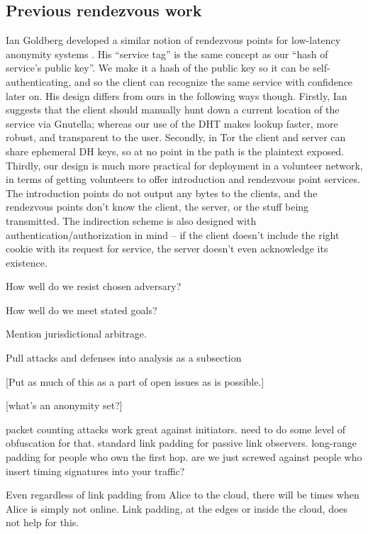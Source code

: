 \documentclass[times,10pt,twocolumn]{article}
\begin{document}
\subsection{Previous rendezvous work}

Ian Goldberg developed a similar notion of rendezvous points for
low-latency anonymity systems \cite{ian-thesis}. His ``service tag''
is the same concept as our ``hash of service's public key''. We make it
a hash of the public key so it can be self-authenticating, and so the
client can recognize the same service with confidence later on. His
design differs from ours in the following ways though. Firstly, Ian
suggests that the client should manually hunt down a current location of
the service via Gnutella; whereas our use of the DHT makes lookup faster,
more robust, and transparent to the user. Secondly, in Tor the client
and server can share ephemeral DH keys, so at no point in the path is
the plaintext
exposed. Thirdly, our design is much more practical for deployment in a
volunteer network, in terms of getting volunteers to offer introduction
and rendezvous point services. The introduction points do not output any
bytes to the clients, and the rendezvous points don't know the client,
the server, or the stuff being transmitted. The indirection scheme
is also designed with authentication/authorization in mind -- if the
client doesn't include the right cookie with its request for service,
the server doesn't even acknowledge its existence.


How well do we resist chosen adversary?

How well do we meet stated goals?

Mention jurisdictional arbitrage.

Pull attacks and defenses into analysis as a subsection

\label{sec:maintaining-anonymity}

[Put as much of this as a part of open issues as is possible.]

[what's an anonymity set?]

packet counting attacks work great against initiators. need to do some
level of obfuscation for that. standard link padding for passive link
observers. long-range padding for people who own the first hop. are
we just screwed against people who insert timing signatures into your
traffic?

Even regardless of link padding from Alice to the cloud, there will be
times when Alice is simply not online. Link padding, at the edges or
inside the cloud, does not help for this.
\end{document}
